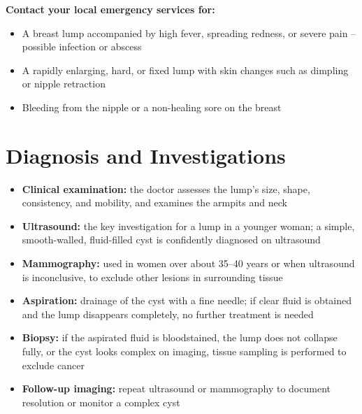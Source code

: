 \textbf{Contact your local emergency services for:}
\begin{itemize}
    \item A breast lump accompanied by high fever, spreading redness, or severe pain -- possible infection or abscess
    \item A rapidly enlarging, hard, or fixed lump with skin changes such as dimpling or nipple retraction
    \item Bleeding from the nipple or a non-healing sore on the breast
\end{itemize}

\section*{Diagnosis and Investigations}
\begin{itemize}
    \item \textbf{Clinical examination:} the doctor assesses the lump's size, shape, consistency, and mobility, and examines the armpits and neck
    \item \textbf{Ultrasound:} the key investigation for a lump in a younger woman; a simple, smooth-walled, fluid-filled cyst is confidently diagnosed on ultrasound
    \item \textbf{Mammography:} used in women over about 35--40 years or when ultrasound is inconclusive, to exclude other lesions in surrounding tissue
    \item \textbf{Aspiration:} drainage of the cyst with a fine needle; if clear fluid is obtained and the lump disappears completely, no further treatment is needed
    \item \textbf{Biopsy:} if the aspirated fluid is bloodstained, the lump does not collapse fully, or the cyst looks complex on imaging, tissue sampling is performed to exclude cancer
    \item \textbf{Follow-up imaging:} repeat ultrasound or mammography to document resolution or monitor a complex cyst
\end{itemize}

